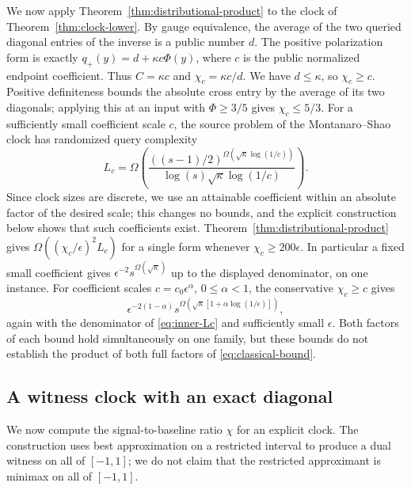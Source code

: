 We now apply Theorem~\ref{thm:distributional-product} to the clock of
Theorem~\ref{thm:clock-lower}. By gauge equivalence, the average of the
two queried diagonal entries of the inverse is a public number $d$. The
positive polarization form is exactly
$q_+(y)=d+\kappa c\Phi(y)$, where $c$ is the public normalized endpoint
coefficient. Thus $C=\kappa c$ and $\chi_c=\kappa c/d$.
We have $d\leq\kappa$, so $\chi_c\geq c$.
Positive definiteness bounds the absolute cross entry by the average
of its two diagonals; applying this at an input with
$\Phi\geq3/5$ gives $\chi_c\leq5/3$.
For a sufficiently small coefficient scale $c$, the source problem of the
Montanaro--Shao clock has randomized query complexity
\begin{equation}\label{eq:inner-Lc}
 L_c=\Omega\left(
 \frac{((s-1)/2)^{\Omega(\sqrt\kappa\log(1/c))}}
 {\log(s)\sqrt\kappa\log(1/c)}\right).
\end{equation}
Since clock sizes are discrete, we use an attainable coefficient within
an absolute factor of the desired scale; this changes no bounds, and the
explicit construction below shows that such coefficients exist.
Theorem~\ref{thm:distributional-product} gives
$\Omega((\chi_c/\epsilon)^2L_c)$ for a single form whenever
$\chi_c\geq200\epsilon$. In particular a fixed small coefficient gives
$\epsilon^{-2}s^{\Omega(\sqrt\kappa)}$ up to the displayed denominator,
on one instance. For coefficient scales $c=c_0\epsilon^\alpha$,
$0\leq\alpha<1$, the conservative $\chi_c\geq c$ gives
\[
 \epsilon^{-2(1-\alpha)}
 s^{\Omega(\sqrt\kappa[1+\alpha\log(1/\epsilon)])},
\]
again with the denominator of \eqref{eq:inner-Lc} and sufficiently
small $\epsilon$. Both factors of each bound hold
simultaneously on one family, but these bounds do not establish the
product of both full factors of \eqref{eq:classical-bound}.

\subsection{A witness clock with an exact diagonal}\label{sec:witness-diagonal}
We now compute the signal-to-baseline ratio $\chi$ for an explicit
clock. The construction uses best approximation on a restricted interval
to produce a dual witness on all of $[-1,1]$; we do not claim that the
restricted approximant is minimax on all of $[-1,1]$.

